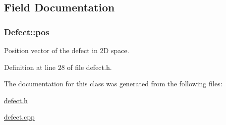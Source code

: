 \subsection{Field Documentation}
\hypertarget{classDefect_aed2731c1beefc22e3db6ad5b18194cdd}{
\subsubsection[{pos}]{ Defect\-::pos\hspace{0.3cm}{\ttfamily [protected]}}}\label{d5/d4f/classDefect_aed2731c1beefc22e3db6ad5b18194cdd}


Position vector of the defect in 2\-D space. 



Definition at line 28 of file defect.\-h.



The documentation for this class was generated from the following files\-:\begin{DoxyCompactItemize}
\item 
\hyperlink{defect_8h}{defect.\-h}\item 
\hyperlink{defect_8cpp}{defect.\-cpp}\end{DoxyCompactItemize}
